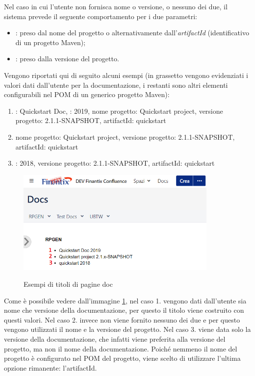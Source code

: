 
	Nel caso in cui l'utente non fornisca nome o versione, o nessuno dei due, il sistema prevede il seguente comportamento per i due parametri:
	\begin{itemize}
		\item {}: preso dal nome del progetto o alternativamente dall'\emph{artifactId} (identificativo di un progetto Maven);
		\item {}: preso dalla versione del progetto.
	\end{itemize} 

	Vengono riportati qui di seguito alcuni esempi (in grassetto vengono evidenziati i valori dati dall'utente per la documentazione, i restanti sono altri elementi configurabili nel POM di un generico progetto Maven):
	\begin{enumerate}
		\item {}: Quickstart Doc,
		: 2019,
		 nome progetto: Quickstart project,  
		 versione progetto: 2.1.1-SNAPSHOT,
		 artifactId: quickstart
		\item nome progetto: Quickstart project, 
		 versione progetto: 2.1.1-SNAPSHOT, 
		  artifactId: quickstart
		\item {}: 2018,
		 versione progetto: 2.1.1-SNAPSHOT, 
		  artifactId: quickstart
	\end{enumerate}

	\begin{figure}[H]
		\centering
		\includegraphics[width=0.88\textwidth]{immagini/DocsExamples.png}\\
		\caption{Esempi di titoli di pagine doc}
		\label{screenDocsNameVersion}
	\end{figure}

	Come è possibile vedere dall'immagine \ref{screenDocsNameVersion}, nel caso 1. vengono dati dall'utente sia nome che versione della documentazione, per questo il titolo viene costruito con questi valori. 
	Nel caso 2. invece non viene fornito nessuno dei due e per questo vengono utilizzati il nome e la versione del progetto. 
	Nel caso 3. viene data solo la versione della documentazione, che infatti viene preferita alla versione del progetto, ma non il nome della documentazione. 
	Poiché nemmeno il nome del progetto è configurato nel POM del progetto, viene scelto di utilizzare l'ultima opzione rimanente: l'artifactId.

